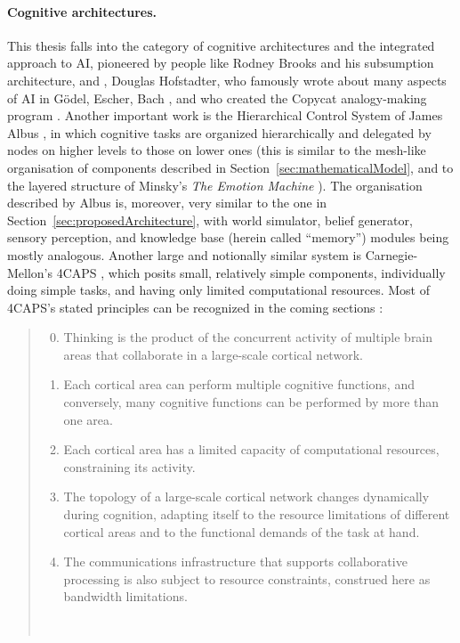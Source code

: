 \paragraph{Cognitive architectures.} This thesis falls into the category of cognitive architectures and the integrated approach to AI, pioneered by people like Rodney Brooks and his subsumption architecture, and \cite{brooksSubsumption}, Douglas Hofstadter, who famously wrote about many aspects of AI in Gödel, Escher, Bach \cite{geb}, and who created the Copycat analogy-making program \cite{copycat}. Another important work is the Hierarchical Control System of James Albus \cite{albusHCS}, in which cognitive tasks are organized hierarchically and delegated by nodes on higher levels to those on lower ones (this is similar to the mesh-like organisation of components described in Section~\ref{sec:mathematicalModel}, and to the layered structure of Minsky's {\em The Emotion Machine} \cite{emotionMachine}). The organisation described by Albus \cite{albus93areference} is, moreover, very similar to the one in Section~\ref{sec:proposedArchitecture}, with world simulator, belief generator, sensory perception, and knowledge base (herein called ``memory'') modules being mostly analogous. Another large and notionally similar system is Carnegie-Mellon's 4CAPS \cite{4caps}, which posits small, relatively simple components, individually doing simple tasks, and having only limited computational resources. Most of 4CAPS's stated principles can be recognized in the coming sections \cite[Operating Principles of 4CAPS]{4caps}:
\begin{quote}
	\begin{enumerate}
		\setcounter{enumi}{-1}
		\item Thinking is the product of the concurrent activity of multiple brain areas that collaborate in a large-scale cortical network. \ellipses
		\item Each cortical area can perform multiple cognitive functions, and conversely, many cognitive functions can be performed by more than one area.
		\item Each cortical area has a limited capacity of computational resources, constraining its activity.
		\item The topology of a large-scale cortical network changes dynamically during cognition, adapting itself to the resource limitations of different cortical areas and to the functional demands of the task at hand.
		\item The communications infrastructure that supports collaborative processing is also subject to resource constraints, construed here as bandwidth limitations.
	\end{enumerate}
	
	\quad\quad\ \ellipses
\end{quote}

